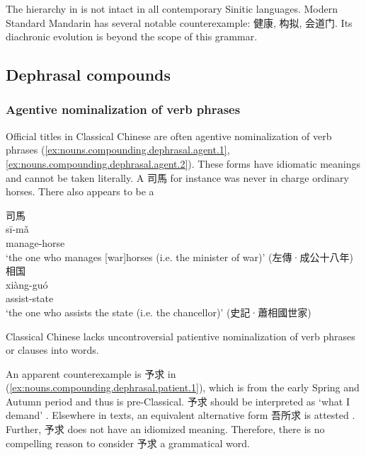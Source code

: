 \documentclass[UTF8, a4paper, oneside, scheme=plain, 12pt]{ctexrep}
\newcommand{\translate}[1]{`#1'}
\begin{document}
The hierarchy in  is not intact in all contemporary Sinitic languages.
Modern Standard Mandarin has several notable counterexample: 健康, 构拟, 会道门.
Its diachronic evolution is beyond the scope of this grammar.


\subsection{Dephrasal compounds}

\subsubsection{Agentive nominalization of verb phrases}

Official titles in Classical Chinese are often agentive nominalization of verb phrases
(\ref{ex:nouns.compounding.dephrasal.agent.1}, \ref{ex:nouns.compounding.dephrasal.agent.2}).
These forms have idiomatic meanings and cannot be taken literally.
A 司馬 for instance was never in charge ordinary horses.
There also appears to be a 

\begin{exe}
    \ex\label{ex:nouns.compounding.dephrasal.agent.1} 
    \glll 司馬 \\ 
    sī-mǎ \\ 
    manage-horse \\ 
    \glt\translate{the one who manages [war]horses (i.e. the minister of war)} \hfill (左傳·成公十八年)
    \ex\label{ex:nouns.compounding.dephrasal.agent.2} 
    \glll 相国 \\
    xiàng-guó \\
    assist-state \\
    \glt\translate{the one who assists the state (i.e. the chancellor)} \hfill (史記·蕭相國世家)
\end{exe}

Classical Chinese lacks uncontroversial patientive nominalization of verb phrases or clauses into words. 

An apparent counterexample is 予求 in (\ref{ex:nouns.compounding.dephrasal.patient.1}), 
which is from the early Spring and Autumn period and thus is pre-Classical.
予求 should be interpreted as \translate{what I demand} \citep{qiu1983yuqiu}.
Elsewhere in texts, an equivalent alternative form 吾所求 is attested \citep{qiu1983yuqiu}.
Further, 予求 does not have an idiomized meaning.
Therefore, there is no compelling reason to consider 予求 a grammatical word.
\end{document}
